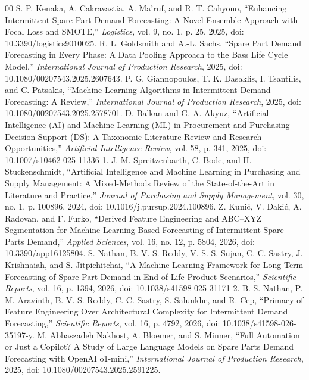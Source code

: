 \documentclass[conference]{IEEEtran}
\begin{document}
\begin{thebibliography}{00}
 S. P. Kenaka, A. Cakravastia, A. Ma'ruf, and R. T. Cahyono, ``Enhancing Intermittent Spare Part Demand Forecasting: A Novel Ensemble Approach with Focal Loss and SMOTE,'' \textit{Logistics}, vol. 9, no. 1, p. 25, 2025, doi: 10.3390/logistics9010025.
 R. L. Goldsmith and A.-L. Sachs, ``Spare Part Demand Forecasting in Every Phase: A Data Pooling Approach to the Bass Life Cycle Model,'' \textit{International Journal of Production Research}, 2025, doi: 10.1080/00207543.2025.2607643.
 P. G. Giannopoulos, T. K. Dasaklis, I. Tsantilis, and C. Patsakis, ``Machine Learning Algorithms in Intermittent Demand Forecasting: A Review,'' \textit{International Journal of Production Research}, 2025, doi: 10.1080/00207543.2025.2578701.
 D. Balkan and G. A. Akyuz, ``Artificial Intelligence (AI) and Machine Learning (ML) in Procurement and Purchasing Decision-Support (DS): A Taxonomic Literature Review and Research Opportunities,'' \textit{Artificial Intelligence Review}, vol. 58, p. 341, 2025, doi: 10.1007/s10462-025-11336-1.
 J. M. Spreitzenbarth, C. Bode, and H. Stuckenschmidt, ``Artificial Intelligence and Machine Learning in Purchasing and Supply Management: A Mixed-Methods Review of the State-of-the-Art in Literature and Practice,'' \textit{Journal of Purchasing and Supply Management}, vol. 30, no. 1, p. 100896, 2024, doi: 10.1016/j.pursup.2024.100896.
 Z. Kuni\'c, V. Daki\'c, A. Radovan, and F. Furko, ``Derived Feature Engineering and ABC--XYZ Segmentation for Machine Learning-Based Forecasting of Intermittent Spare Parts Demand,'' \textit{Applied Sciences}, vol. 16, no. 12, p. 5804, 2026, doi: 10.3390/app16125804.
 S. Nathan, B. V. S. Reddy, V. S. S. Sujan, C. C. Sastry, J. Krishnaiah, and S. Jitpichitchai, ``A Machine Learning Framework for Long-Term Forecasting of Spare Part Demand in End-of-Life Product Scenarios,'' \textit{Scientific Reports}, vol. 16, p. 1394, 2026, doi: 10.1038/s41598-025-31171-2.
 B. S. Nathan, P. M. Aravinth, B. V. S. Reddy, C. C. Sastry, S. Salunkhe, and R. Cep, ``Primacy of Feature Engineering Over Architectural Complexity for Intermittent Demand Forecasting,'' \textit{Scientific Reports}, vol. 16, p. 4792, 2026, doi: 10.1038/s41598-026-35197-y.
 M. Abbaszadeh Nakhost, A. Bloemer, and S. Minner, ``Full Automation or Just a Copilot? A Study of Large Language Models on Spare Parts Demand Forecasting with OpenAI o1-mini,'' \textit{International Journal of Production Research}, 2025, doi: 10.1080/00207543.2025.2591225.

\end{thebibliography}
\end{document}
